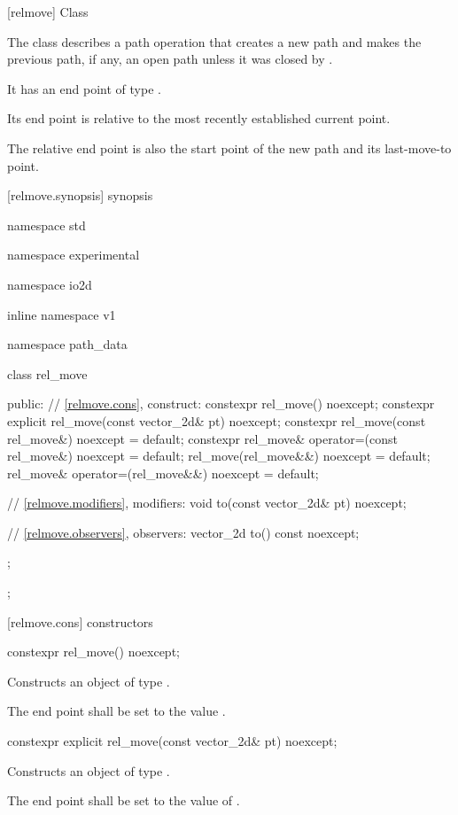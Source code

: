  [relmove] {Class }

\pnum
{}
The class  describes a path operation that creates a new path and makes the previous path, if any, an open path unless it was closed by .

\pnum
It has an end point of type .

\pnum
Its end point is relative to the most recently established current point.

\pnum
The relative end point is also the start point of the new path and its last-move-to point.

 [relmove.synopsis] { synopsis}

\begin{codeblock}
namespace std { namespace experimental { namespace io2d { inline namespace v1 {
  namespace path_data {
    class rel_move {
    public:
      // \ref{relmove.cons}, construct:
      constexpr rel_move() noexcept;
      constexpr explicit rel_move(const vector_2d& pt) noexcept;
      constexpr rel_move(const rel_move&) noexcept = default;
      constexpr rel_move& operator=(const rel_move&) noexcept = default;
      rel_move(rel_move&&) noexcept = default;
      rel_move& operator=(rel_move&&) noexcept = default;

      // \ref{relmove.modifiers}, modifiers:
      void to(const vector_2d& pt) noexcept;

      // \ref{relmove.observers}, observers:
      vector_2d to() const noexcept;
    };
  };
} } } }
\end{codeblock}

 [relmove.cons] { constructors}

\begin{itemdecl}
constexpr rel_move() noexcept;
\end{itemdecl}
\begin{itemdescr}
\pnum
\effects
Constructs an object of type .

\pnum
The end point shall be set to the value .
\end{itemdescr}

\begin{itemdecl}
constexpr explicit rel_move(const vector_2d& pt) noexcept;
\end{itemdecl}
\begin{itemdescr}
\pnum
\effects
Constructs an object of type .

\pnum
The end point shall be set to the value of .
\end{itemdescr}

